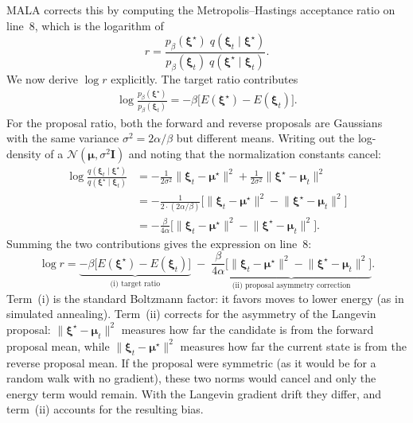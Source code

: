 MALA corrects this by computing the Metropolis--Hastings acceptance ratio on line~8, which is the logarithm of
\begin{equation}\label{eq:mala-ratio}
r = \frac{p_\beta(\boldsymbol{\xi}^{\star})\;q(\boldsymbol{\xi}_t\mid\boldsymbol{\xi}^{\star})}
         {p_\beta(\boldsymbol{\xi}_t)\;q(\boldsymbol{\xi}^{\star}\mid\boldsymbol{\xi}_t)}.
\end{equation}
We now derive $\log r$ explicitly. The target ratio contributes
\begin{align*}
\log\frac{p_\beta(\boldsymbol{\xi}^{\star})}{p_\beta(\boldsymbol{\xi}_t)}
= -\beta\bigl[E(\boldsymbol{\xi}^{\star})-E(\boldsymbol{\xi}_t)\bigr].
\end{align*}
For the proposal ratio, both the forward and reverse proposals are Gaussians with the same variance $\sigma^{2}=2\alpha/\beta$ but different means. Writing out the log-density of a $\mathcal{N}(\boldsymbol{\mu},\sigma^{2}\mathbf{I})$ and noting that the normalization constants cancel:
\begin{align*}
\log\frac{q(\boldsymbol{\xi}_t\mid\boldsymbol{\xi}^{\star})}{q(\boldsymbol{\xi}^{\star}\mid\boldsymbol{\xi}_t)}
&= -\frac{1}{2\sigma^{2}}\lVert\boldsymbol{\xi}_t-\boldsymbol{\mu}^{\star}\rVert^{2}
   +\frac{1}{2\sigma^{2}}\lVert\boldsymbol{\xi}^{\star}-\boldsymbol{\mu}_t\rVert^{2}\\
&= -\frac{1}{2\cdot(2\alpha/\beta)}\bigl[\lVert\boldsymbol{\xi}_t-\boldsymbol{\mu}^{\star}\rVert^{2}
   -\lVert\boldsymbol{\xi}^{\star}-\boldsymbol{\mu}_t\rVert^{2}\bigr]\\
&= -\frac{\beta}{4\alpha}\bigl[\lVert\boldsymbol{\xi}_t-\boldsymbol{\mu}^{\star}\rVert^{2}
   -\lVert\boldsymbol{\xi}^{\star}-\boldsymbol{\mu}_t\rVert^{2}\bigr].
\end{align*}
Summing the two contributions gives the expression on line~8:
\begin{equation}\label{eq:mala-log-ratio}
\log r
= \underbrace{-\beta\bigl[E(\boldsymbol{\xi}^{\star}) - E(\boldsymbol{\xi}_t)\bigr]}_{\text{(i) target ratio}}
  \;-\;\underbrace{\frac{\beta}{4\alpha}\bigl[\lVert\boldsymbol{\xi}_t - \boldsymbol{\mu}^{\star}\rVert^2 - \lVert\boldsymbol{\xi}^{\star} - \boldsymbol{\mu}_t\rVert^2\bigr]}_{\text{(ii) proposal asymmetry correction}}.
\end{equation}
Term~(i) is the standard Boltzmann factor: it favors moves to lower energy (as in simulated annealing). Term~(ii) corrects for the asymmetry of the Langevin proposal: $\lVert\boldsymbol{\xi}^{\star}-\boldsymbol{\mu}_t\rVert^2$ measures how far the candidate is from the forward proposal mean, while $\lVert\boldsymbol{\xi}_t-\boldsymbol{\mu}^{\star}\rVert^2$ measures how far the current state is from the reverse proposal mean. If the proposal were symmetric (as it would be for a random walk with no gradient), these two norms would cancel and only the energy term would remain. With the Langevin gradient drift they differ, and term~(ii) accounts for the resulting bias.

